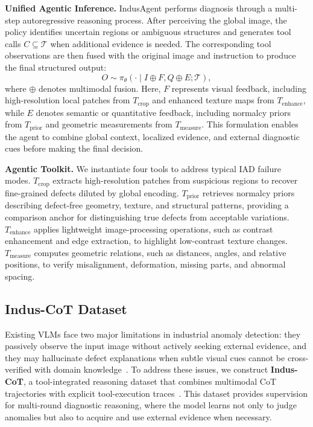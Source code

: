 \documentclass{llmxive}
\begin{document}
\textbf{Unified Agentic Inference.} 
IndusAgent performs diagnosis through a multi-step autoregressive reasoning process. 
After perceiving the global image, the policy identifies uncertain regions or ambiguous structures and generates tool calls $C \subseteq \mathcal{T}$ when additional evidence is needed. 
The corresponding tool observations are then fused with the original image and instruction to produce the final structured output:
\begin{equation}
O \sim \pi_\theta(\cdot \mid I \oplus F, Q \oplus E; \mathcal{T}),
\end{equation}
where $\oplus$ denotes multimodal fusion. 
Here, $F$ represents visual feedback, including high-resolution local patches from $T_{\text{crop}}$ and enhanced texture maps from $T_{\text{enhance}}$, while $E$ denotes semantic or quantitative feedback, including normalcy priors from $T_{\text{prior}}$ and geometric measurements from $T_{\text{measure}}$. 
This formulation enables the agent to combine global context, localized evidence, and external diagnostic cues before making the final decision.

\textbf{Agentic Toolkit.}
We instantiate four tools to address typical IAD failure modes. $T_{\text{crop}}$ extracts high-resolution patches from suspicious regions to recover fine-grained defects diluted by global encoding. $T_{\text{prior}}$ retrieves normalcy priors describing defect-free geometry, texture, and structural patterns, providing a comparison anchor for distinguishing true defects from acceptable variations. $T_{\text{enhance}}$ applies lightweight image-processing operations, such as contrast enhancement and edge extraction, to highlight low-contrast texture changes. $T_{\text{measure}}$ computes geometric relations, such as distances, angles, and relative positions, to verify misalignment, deformation, missing parts, and abnormal spacing.

\subsection{Indus-CoT Dataset}
\label{sec:Training}

Existing VLMs face two major limitations in industrial anomaly detection: they passively observe the input image without actively seeking external evidence, and they may hallucinate defect explanations when subtle visual cues cannot be cross-verified with domain knowledge~\citep{driess2023palm, sun2024aligning}. 
To address these issues, we construct \textbf{Indus-CoT}, a tool-integrated reasoning dataset that combines multimodal CoT trajectories with explicit tool-execution traces~\citep{zhang2023multimodal, chen2023fireact}. 
This dataset provides supervision for multi-round diagnostic reasoning, where the model learns not only to judge anomalies but also to acquire and use external evidence when necessary.
\end{document}
